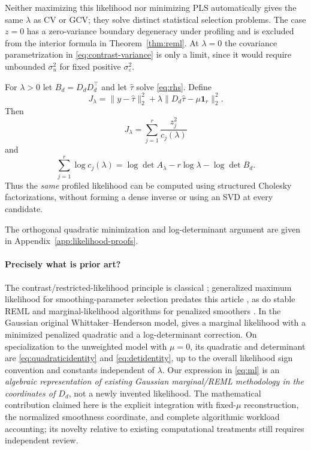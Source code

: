 Neither maximizing this likelihood nor
minimizing PLS automatically gives the same
$\lambda$ as CV or GCV; they solve distinct
statistical selection problems. The case $z=0$
has a zero-variance boundary degeneracy
under profiling and is excluded from the
interior formula in Theorem~\ref{thm:reml}.
At $\lambda=0$ the covariance parametrization
in \eqref{eq:contrast-variance} is only a
limit, since it would require unbounded
$\sigma_u^2$ for fixed positive
$\sigma_\varepsilon^2$.

\begin{proposition}
\label{prop:det}
For $\lambda>0$ let
$B_d=D_dD_d^\top$ and let
$\widehat\tau$ solve \eqref{eq:rhs}. Define
\begin{equation}\label{eq:likelihood-J}
J_\lambda=
\|y-\widehat\tau\|_2^2+
\lambda\|D_d\widehat\tau-\mu\mathbf1_r\|_2^2.
\end{equation}
Then
\begin{equation}\label{eq:quadraticidentity}
J_\lambda=\sum_{j=1}^r
\frac{z_j^2}{c_j(\lambda)}
\end{equation}
and
\begin{equation}\label{eq:detidentity}
\sum_{j=1}^r\log c_j(\lambda)
=\log\det A_\lambda-r\log\lambda
-\log\det B_d.
\end{equation}
Thus the \emph{same} profiled likelihood
can be computed using structured Cholesky
factorizations, without forming a dense
inverse or using an SVD at every candidate.
\end{proposition}
The orthogonal quadratic minimization and log-determinant
argument are given in Appendix~\ref{app:likelihood-proofs}.


\paragraph{Precisely what is prior art?}
The contrast/restricted-likelihood principle
is classical \citep{patterson1971}; generalized
maximum likelihood for smoothing-parameter
selection predates this article
\citep{wahba1985}, as do stable REML and
marginal-likelihood algorithms for penalized
smoothers \citep{wood2011}. In the
Gaussian original Whittaker--Henderson
model, \citet[Sec.~5.3]{biessy2026}
gives a marginal likelihood with a minimized
penalized quadratic and a
log-determinant correction. On specialization
to the unweighted model with $\mu=0$,
its quadratic and determinant are
\eqref{eq:quadraticidentity} and
\eqref{eq:detidentity}, up to
the overall likelihood sign convention
and constants independent of $\lambda$.
Our expression in \eqref{eq:ml}
is an \emph{algebraic representation of
existing Gaussian marginal/REML methodology
in the coordinates of $D_d$}, not a
newly invented likelihood. The mathematical
contribution claimed here is the explicit
integration with fixed-$\mu$ reconstruction,
the normalized smoothness coordinate,
and complete algorithmic workload accounting;
its novelty relative to existing computational
treatments still requires independent review.


